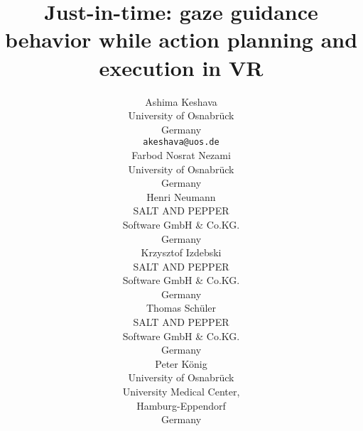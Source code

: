 \documentclass{article}
\begin{document}
\title{Just-in-time: gaze guidance behavior while action planning and execution in VR}

\author{
  Ashima Keshava\\
  University of Osnabr{\"u}ck\\
  Germany\\
  \texttt{akeshava@uos.de} \\
   \And
   Farbod Nosrat Nezami\\
  University of Osnabr{\"u}ck\\
  Germany
  
   \And
   Henri Neumann\\
  SALT AND PEPPER \\ Software GmbH \& Co.KG.\\
  Germany\\
   \And
  Krzysztof Izdebski\\
  SALT AND PEPPER \\ Software GmbH \& Co.KG.\\
  Germany\\
   \And
   Thomas Sch{\"u}ler\\
  SALT AND PEPPER \\ Software GmbH \& Co.KG.\\
  Germany\\
   \And
   Peter K{\"o}nig\\
   University of Osnabr{\"u}ck\\
   University Medical Center,\\ Hamburg-Eppendorf\\
   Germany
}

\maketitle

\begin{abstract}

\end{abstract}


\linenumbers
\captionsetup[figure]{font=scriptsize,labelfont=bf}






% 
\end{document}
